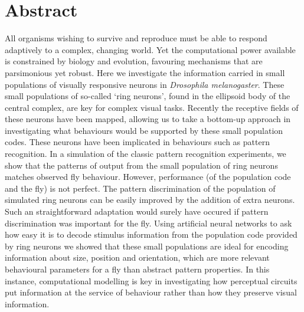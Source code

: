 \section*{Abstract}
All organisms wishing to survive and reproduce must be able to respond adaptively to a complex, changing world.
Yet the computational power available is constrained by biology and evolution, favouring mechanisms that are parsimonious yet robust.
Here we investigate the information carried in small populations of visually responsive neurons in \emph{Drosophila melanogaster}.
These small populations of so-called `ring neurons', found in the ellipsoid body of the central complex, are key for complex visual tasks.
Recently the receptive fields of these neurons have been mapped, allowing us to take a bottom-up approach in investigating what behaviours would be supported by these small population codes. These neurons have been implicated in behaviours such as pattern recognition. In a simulation of the classic pattern recognition experiments, we show that the patterns of output from the small population of ring neurons matches observed fly behaviour. However, performance (of the population code and the fly) is not perfect. The pattern discrimination of the population of simulated ring neurons can be easily improved by the addition of extra neurons. Such an straightforward adaptation would surely have occured if pattern discrimination was important for the fly. Using artificial neural networks to ask how easy it is to decode stimulus information from the population code provided by ring neurons we showed that these small populations are ideal for encoding information about size, position and orientation, which are more relevant behavioural parameters for a fly than abstract pattern properties. In this instance, computational modelling is key in investigating how perceptual circuits put information at the service of behaviour rather than how they preserve visual information.